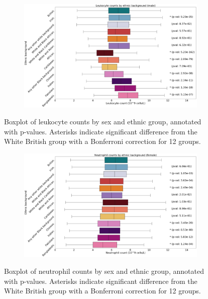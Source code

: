 \documentclass[12pt]{pnas-new}
\begin{document}
\begin{figure}
    \centering
    \begin{subfigure}{\textwidth}
    \includegraphics[width=\textwidth]{images/male_leukocyte_boxplot_annotated.pdf}
    \end{subfigure}
    \caption{Boxplot of leukocyte counts by sex and ethnic group, annotated with p-values. Asterisks indicate significant difference from the White British group with a Bonferroni correction for 12 groups.}
    \label{fig:supp_box_leukocyte_m}
\end{figure}

\begin{figure}
    \centering
    \begin{subfigure}{\textwidth}
    \includegraphics[width=\textwidth]{images/female_neutrophil_boxplot_annotated.pdf}
    \end{subfigure}
    \caption{Boxplot of neutrophil counts by sex and ethnic group, annotated with p-values. Asterisks indicate significant difference from the White British group with a Bonferroni correction for 12 groups.}
    \label{fig:supp_box_neutrophill_f}
\end{figure}
\end{document}
